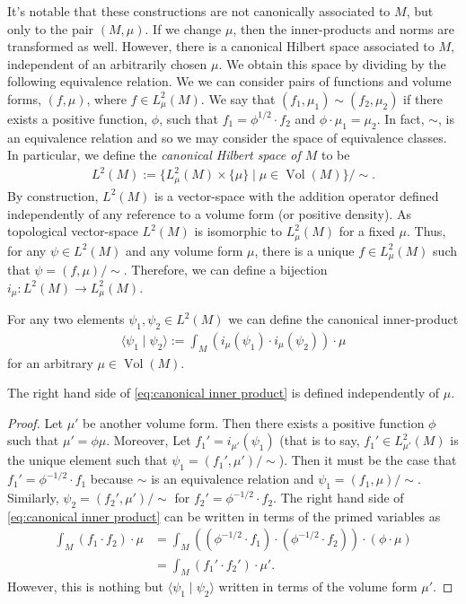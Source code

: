 \documentclass[final,leqno]{siamart}
\begin{document}
It's notable that these constructions are not canonically associated to $M$, but only to the pair $(M, \mu)$.
If we change $\mu$, then the inner-products and norms are transformed as well.
However, there is a canonical Hilbert space associated to $M$, independent of an arbitrarily chosen $\mu$.
We obtain this space by dividing by the following equivalence relation.
We we can consider pairs of functions and volume forms, $(f,\mu)$, where $f \in L^2_\mu(M)$.
We say that $(f_1, \mu_1) \sim (f_2,\mu_2)$ if there exists a positive function, $\phi$, such that $f_1 = \phi^{1/2} \cdot f_2$ and $\phi \cdot \mu_1 = \mu_2$.
In fact, $\sim$, is an equivalence relation and so we may consider the space of equivalence classes.
In particular, we define the \emph{canonical Hilbert space of $M$} to be
\begin{align*}
	L^2(M) := \{ L^2_\mu(M) \times \{ \mu \} \mid \mu \in \operatorname{Vol}(M) \} / \sim.
\end{align*}
By construction, $L^2(M)$ is a vector-space with the addition operator defined independently of any reference to a volume form (or positive density).
As topological vector-space $L^2(M)$ is isomorphic to $L^2_\mu(M)$ for a fixed $\mu$.
Thus, for any $\psi \in L^2(M)$ and any volume form $\mu$, there is a unique $f \in L^2_\mu(M)$ such that $\psi = (f,\mu) / \sim$.
Therefore, we can define a bijection $i_{\mu} : L^2(M) \to L^2_\mu(M)$.

For any two elements $\psi_1, \psi_2 \in L^2(M)$ we can define the canonical inner-product
\begin{align}
	\langle \psi_1 \mid \psi_2 \rangle := \int_M (i_{\mu}( \psi_1) \cdot i_{\mu}( \psi_2) ) \cdot \mu \label{eq:canonical inner product}
\end{align}
for an arbitrary $\mu \in \operatorname{Vol}(M)$.

\begin{proposition}
	The right hand side of \eqref{eq:canonical inner product} is defined independently of $\mu$.
\end{proposition}
\begin{proof}
	Let $\mu'$ be another volume form.
	Then there exists a positive function $\phi$ such that $\mu' = \phi \mu$.
	Moreover, Let $f_1' = i_{\mu'}( \psi_1)$ (that is to say, $f_1' \in L^2_{\mu'}(M)$ is the unique element such that $\psi_1 = (  f_1', \mu' ) / \sim$).
	Then it must be the case that $f_1' = \phi^{-1/2} \cdot f_1$ because $\sim$ is an equivalence relation and $\psi_1 = (f_1,\mu) / \sim$.
	Similarly, $\psi_2 = ( f_2', \mu' ) / \sim$ for $f_2' = \phi^{-1/2} \cdot f_2$.
	The right hand side of \eqref{eq:canonical inner product} can be written in terms of the primed variables as
	\begin{align*}
		\int_M (f_1 \cdot f_2) \cdot \mu &= \int_M ( (\phi^{-1/2} \cdot f_1) \cdot (\phi^{-1/2} \cdot f_2) ) \cdot (\phi \cdot \mu) \\
			&= \int_M ( f_1' \cdot f_2') \cdot \mu'.
	\end{align*}
	However, this is nothing but $\langle \psi_1 \mid \psi_2 \rangle$ written in terms of the volume form $\mu'$.
\end{proof}
\end{document}
